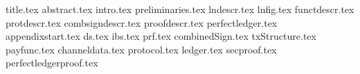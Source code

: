 \documentclass[conference,compsoc]{IEEEtran}
\begin{document}
\pagestyle{plain}
{title.tex}
{abstract.tex}
{intro.tex}
{preliminaries.tex}
{lndescr.tex}
{lnfig.tex}
{functdescr.tex}
{protdescr.tex}
{combsigndescr.tex}
{proofdescr.tex}
{perfectledger.tex}
{appendixstart.tex}
{ds.tex}
{ibs.tex}
{prf.tex}
{combinedSign.tex}
{txStructure.tex}
{payfunc.tex}
{channeldata.tex}
{protocol.tex}
{ledger.tex}
{secproof.tex}
{perfectledgerproof.tex}



\end{document}
